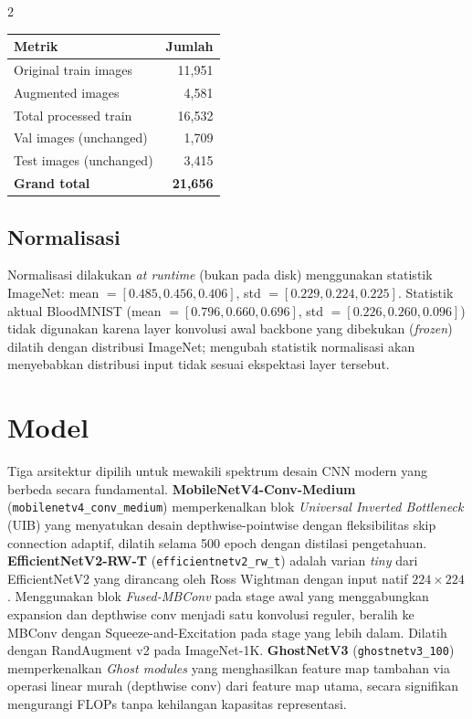 \documentclass[10pt]{article}
\begin{document}
\begin{multicols}{2}
\begin{center}
\small
\begin{tabular}{lr}
\toprule
\textbf{Metrik} & \textbf{Jumlah} \\
\midrule
Original train images   & 11{,}951  \\
Augmented images        &  4{,}581  \\
Total processed train   & 16{,}532 \\
Val images (unchanged)  &  1{,}709  \\
Test images (unchanged) &  3{,}415  \\
\textbf{Grand total}    & \textbf{21{,}656} \\
\bottomrule
\end{tabular}
\end{center}

\subsection*{Normalisasi}

Normalisasi dilakukan \textit{at runtime} (bukan pada disk) menggunakan statistik ImageNet: mean $= [0.485, 0.456, 0.406]$, std $= [0.229, 0.224, 0.225]$. Statistik aktual BloodMNIST (mean $= [0.796, 0.660, 0.696]$, std $= [0.226, 0.260, 0.096]$) tidak digunakan karena layer konvolusi awal backbone yang dibekukan (\textit{frozen}) dilatih dengan distribusi ImageNet; mengubah statistik normalisasi akan menyebabkan distribusi input tidak sesuai ekspektasi layer tersebut.

\section{Model}

Tiga arsitektur dipilih untuk mewakili spektrum desain CNN modern yang berbeda secara fundamental. \textbf{MobileNetV4-Conv-Medium} (\texttt{mobilenetv4\_conv\_medium}) memperkenalkan blok \textit{Universal Inverted Bottleneck} (UIB) yang menyatukan desain depthwise-pointwise dengan fleksibilitas skip connection adaptif, dilatih selama 500 epoch dengan distilasi pengetahuan. \textbf{EfficientNetV2-RW-T} (\texttt{efficientnetv2\_rw\_t}) adalah varian \textit{tiny} dari EfficientNetV2 yang dirancang oleh Ross Wightman dengan input natif $224\times224$. Menggunakan blok \textit{Fused-MBConv} pada stage awal yang menggabungkan expansion dan depthwise conv menjadi satu konvolusi reguler, beralih ke MBConv dengan Squeeze-and-Excitation pada stage yang lebih dalam. Dilatih dengan RandAugment v2 pada ImageNet-1K. \textbf{GhostNetV3} (\texttt{ghostnetv3\_100}) memperkenalkan \textit{Ghost modules} yang menghasilkan feature map tambahan via operasi linear murah (depthwise conv) dari feature map utama, secara signifikan mengurangi FLOPs tanpa kehilangan kapasitas representasi.


\end{multicols}
\end{document}
